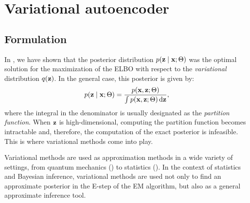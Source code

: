 \section{Variational autoencoder}
\label{sec:variational_autoencoder}

\subsection{Formulation}
In , we have shown that the posterior distribution $p({\mathbf{z}} \mid {\mathbf{x}}; \Theta)$ was the optimal solution for the maximization of the ELBO with respect to the \emph{variational} distribution $q({\mathbf{z}})$. In the general case, this posterior is given by:
\begin{equation}
    p({\mathbf{z}} \mid {\mathbf{x}}; \Theta) = \frac{p({\mathbf{x}}, {\mathbf{z}}; \Theta)}{\int p({\mathbf{x}}, {\mathbf{z}}; \Theta) {\,\text{d}} {\mathbf{z}}},
\end{equation}
where the integral in the denominator is usually designated as the \emph{partition function}. When ${\mathbf{z}}$ is high-dimensional, computing the partition function becomes intractable and, therefore, the computation of the exact posterior is infeasible. This is where variational methods come into play.

Variational methods are used as approximation methods in a wide variety of settings, from quantum mechanics (\citet{Sakurai2017}) to statistics (\citet{Rustagi1976}). In the context of statistics and Bayesian inference, variational methods are used not only to find an approximate posterior in the E-step of the EM algorithm, but also as a general approximate inference tool.

